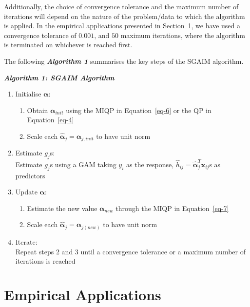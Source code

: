 \documentclass[11pt,a4paper,]{article}
\providecommand{\tightlist}{%
  \setlength{\itemsep}{0pt}\setlength{\parskip}{0pt}}
\begin{document}
Additionally, the choice of convergence tolerance and the maximum number
of iterations will depend on the nature of the problem/data to which the
algorithm is applied. In the empirical applications presented in
Section~\ref{sec-application}, we have used a convergence tolerance of
\(0.001\), and \(50\) maximum iterations, where the algorithm is
terminated on whichever is reached first.

The following \textbf{\emph{Algorithm 1}} summarises the key steps of
the SGAIM algorithm.

\textbf{\emph{Algorithm 1: SGAIM Algorithm}}

\begin{enumerate}
\def\labelenumi{\arabic{enumi}.}
\item
  Initialise \(\bm{\alpha}\):

  \begin{enumerate}
  \def\labelenumii{\alph{enumii}.}
  \tightlist
  \item
    Obtain \(\bm{\alpha}_{init}\) using the MIQP in Equation~\ref{eq-6}
    or the QP in Equation~\ref{eq-4}
  \item
    Scale each \(\hat{\bm{\alpha}}_{j} = \bm{\alpha}_{j, init}\) to have
    unit norm
  \end{enumerate}
\item
  Estimate \(g_{j}\)s:\\
  Estimate \(g_{j}\)s using a GAM taking \(y_{i}\) as the response,
  \(\hat{h}_{ij} = \hat{\bm{\alpha}}_{j}^{T}\bm{x}_{ij}\)s as predictors
\item
  Update \(\bm{\alpha}\):

  \begin{enumerate}
  \def\labelenumii{\alph{enumii}.}
  \tightlist
  \item
    Estimate the new value \(\bm{\alpha}_{new}\) through the MIQP in
    Equation~\ref{eq-7}
  \item
    Scale each \(\hat{\bm{\alpha}}_{j} = \bm{\alpha}_{j(new)}\) to have
    unit norm
  \end{enumerate}
\item
  Iterate:\\
  Repeat steps 2 and 3 until a convergence tolerance or a maximum number
  of iterations is reached
\end{enumerate}

\hypertarget{sec-application}{%
\section{Empirical Applications}\label{sec-application}}
\end{document}
